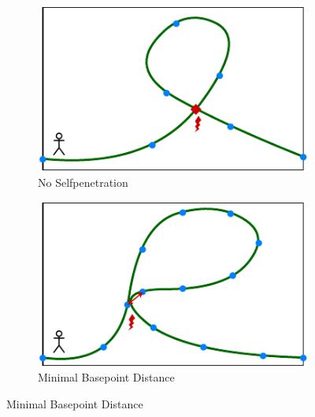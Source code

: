\begin{figure}[htbp]
  \centering
  \begin{subfigure}{.5\linewidth}
    \centering
    \includegraphics[width=.97\linewidth]{figures/constraints/NoSelfPenetration.pdf}
    \caption{No Selfpenetration}
    \label{pic:noSelfPenetration}
  \end{subfigure}%
  \begin{subfigure}{.5\linewidth}
    \centering
    \includegraphics[width=.97\linewidth]{figures/constraints/minimalBasepointDistance.pdf}
    \caption{Minimal Basepoint Distance}
    \label{pic:minimalBasepointDistance}
  \end{subfigure}


\end{figure}
